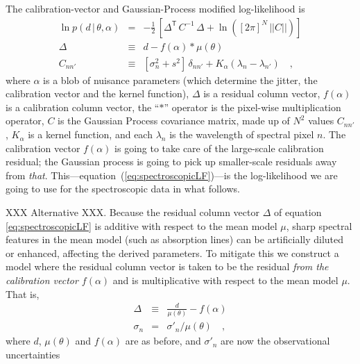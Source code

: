 \documentclass[iop,numberedappendix]{emulateapj}
\newcommand{\transpose}[1]{{#1}^{\!\mathsf T}}
\newcommand{\given}{\,|\,}
\renewcommand{\det}[1]{||{#1}||}
\begin{document}
The calibration-vector and Gaussian-Process modified log-likelihood is
\begin{eqnarray}\label{eq:spectroscopicLF}
\ln p(d\given\theta,\alpha) &=& -\frac{1}{2}\,\left[\transpose{\Delta}\,C^{-1}\,\Delta + \ln([2\pi]^N\,\det{C}) \right]
\\
\Delta &\equiv& d - f(\alpha)\ast\mu(\theta)
\\
C_{nn'} &\equiv& [\sigma_n^2 + s^2]\,\delta_{nn'} + K_\alpha(\lambda_n - \lambda_{n'})
\quad ,
\end{eqnarray}
where $\alpha$ is a blob of nuisance parameters
(which determine the jitter, the calibration vector and the kernel function),
$\Delta$ is a residual column vector,
$f(\alpha)$ is a calibration column vector,
the ``$\ast$'' operator is the pixel-wise multiplication operator,
$C$ is the Gaussian Process covariance matrix,
made up of $N^2$ values $C_{nn'}$,
$K_\alpha$ is a kernel function,
and each $\lambda_n$ is the wavelength of spectral pixel $n$.
The calibration vector $f(\alpha)$ is going to take care of the
large-scale calibration residual; the Gaussian process is going to
pick up smaller-scale residuals away from \emph{that}.
This---equation~(\ref{eq:spectroscopicLF})---is the log-likelihood we
are going to use for the spectroscopic data in what follows.

XXX Alternative XXX.
Because the residual column vector $\Delta$ of equation
\ref{eq:spectroscopicLF} is additive with respect to the mean model
$\mu$, sharp spectral features in the mean model (such as absorption
lines) can be artificially
diluted or enhanced, affecting the derived parameters. To mitigate this we construct a
model where the residual column vector is taken to be the residual
\emph{from the calibration vector $f(\alpha)$} and is multiplicative
with respect to the mean model $\mu$.  That is,
\begin{eqnarray}\label{eq:spectroscopicLFalt} \Delta &\equiv&
\frac{d}{\mu(\theta)} - f(\alpha) \\
\sigma_{n} & = & \sigma'_n / \mu(\theta)
\quad ,
\end{eqnarray}
where $d$, $\mu(\theta)$ and $f(\alpha)$ are as before, and
$\sigma'_{n}$ are now the observational uncertainties
\end{document}
